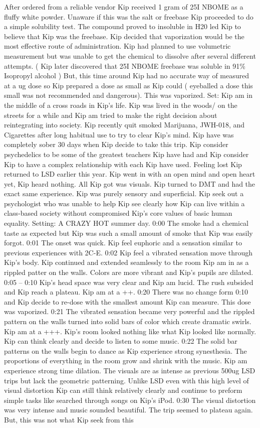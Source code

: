 \documentclass[12pt]{book}
\begin{document}
After ordered from a reliable vendor Kip received 1 gram of 25I NBOME as a fluffy white powder. Unaware if this was the salt or freebase Kip proceeded to do a simple solubility test. The compound proved to insoluble in H20 led Kip to believe that Kip was the freebase. Kip decided that vaporization would be the most effective route of administration. Kip had planned to use volumetric measurement but was unable to get the chemical to dissolve after several different attempts. ( Kip later discovered that 25I NBOME freebase was soluble in 91\% Isopropyl alcohol ) But, this time around Kip had no accurate way of measured at a ug dose so Kip prepared a dose as small as Kip could ( eyeballed a dose this small was not recommended and dangerous). This was vaporized. Set: Kip am in the middle of a cross roads in Kip's life. Kip was lived in the woods/ on the streets for a while and Kip am tried to make the right decision about reintegrating into society. Kip recently quit smoked Marijuana, JWH-018, and Cigarettes after long habitual use to try to clear Kip's mind. Kip have was completely sober 30 days when Kip decide to take this trip. Kip consider psychedelics to be some of the greatest teachers Kip have had and Kip consider Kip to have a complex relationship with each Kip have used. Feeling lost Kip returned to LSD earlier this year. Kip went in with an open mind and open heart yet, Kip heard nothing. All Kip got was visuals. Kip turned to DMT and had the exact same experience. Kip was purely sensory and superficial. Kip seek out a psychologist who was unable to help Kip see clearly how Kip can live within a class-based society without compromised Kip's core values of basic human equality. Setting: A CRAZY HOT summer day. 0:00 The smoke had a chemical taste as expected but Kip was such a small amount of smoke that Kip was easily forgot. 0:01 The onset was quick. Kip feel euphoric and a sensation similar to previous experiences with 2C-E. 0:02 Kip feel a vibrated sensation move through Kip's body. Kip continued and extended seamlessly to the room Kip am in as a rippled patter on the walls. Colors are more vibrant and Kip's pupils are dilated. 0:05 -- 0:10 Kip's head space was very clear and Kip am lucid. The rush subsided and Kip reach a plateau. Kip am at a ++. 0:20 There was no change form 0:10 and Kip decide to re-dose with the smallest amount Kip can measure. This dose was vaporized. 0:21 The vibrated sensation became very powerful and the rippled pattern on the walls turned into solid bars of color which create dramatic swirls. Kip am at a +++. Kip's room looked nothing like what Kip looked like normally. Kip can think clearly and decide to listen to some music. 0:22 The solid bar patterns on the walls begin to dance as Kip experience strong synesthesia. The proportions of everything in the room grow and shrink with the music. Kip am experience strong time dilation. The visuals are as intense as previous 500ug LSD trips but lack the geometric patterning. Unlike LSD even with this high level of visual distortion Kip can still think relatively clearly and continue to preform simple tasks like searched through songs on Kip's iPod. 0:30 The visual distortion was very intense and music sounded beautiful. The trip seemed to plateau again. But, this was not what Kip seek from this 
\end{document}

